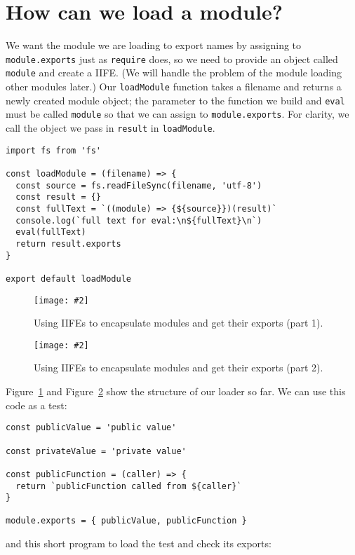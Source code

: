\documentclass[krantzl]{krantz}
\newcommand{\figpdf}[4]{\begin{figure}%
\centering%
\texttt{[image: \#2]}%
\caption{#3}%
\label{#1}%
\end{figure}}
\newcommand{\figref}[1]{Figure~\ref{#1}}
\begin{document}
\section{How can we load a module?}\label{module-loader-load}


We want the module we are loading to export names by assigning to \texttt{module.exports} just as \texttt{require} does,
so we need to provide an object called \texttt{module} and create a IIFE.
(We will handle the problem of the module loading other modules later.)
Our \texttt{loadModule} function takes a filename and returns a newly created module object;
the parameter to the function we build and \texttt{eval} must be called \texttt{module} so that we can assign to \texttt{module.exports}.
For clarity,
we call the object we pass in \texttt{result} in \texttt{loadModule}.


\begin{lstlisting}[frame=tblr]
import fs from 'fs'

const loadModule = (filename) => {
  const source = fs.readFileSync(filename, 'utf-8')
  const result = {}
  const fullText = `((module) => {${source}})(result)`
  console.log(`full text for eval:\n${fullText}\n`)
  eval(fullText)
  return result.exports
}

export default loadModule
\end{lstlisting}


\figpdf{module-loader-iife-a}{./module-loader/iife-a.pdf}{Using IIFEs to encapsulate modules and get their exports (part 1).}{0.6}

\figpdf{module-loader-iife-b}{./module-loader/iife-b.pdf}{Using IIFEs to encapsulate modules and get their exports (part 2).}{0.6}


\figref{module-loader-iife-a} and \figref{module-loader-iife-b} show the structure of our loader so far.
We can use this code as a test:


\begin{lstlisting}[frame=tblr]
const publicValue = 'public value'

const privateValue = 'private value'

const publicFunction = (caller) => {
  return `publicFunction called from ${caller}`
}

module.exports = { publicValue, publicFunction }
\end{lstlisting}



\noindent and this short program to load the test and check its exports:
\end{document}

